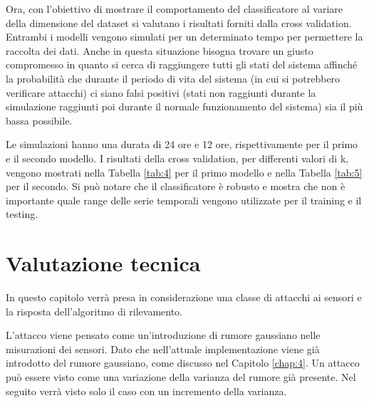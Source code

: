 \documentclass[Lau,binding=0.6cm,noexaminfo]{sapthesis}
\begin{document}
Ora, con l'obiettivo di mostrare il comportamento del classificatore al variare della dimensione del dataset si valutano i risultati  forniti dalla cross validation.
Entrambi i modelli vengono simulati per un determinato tempo per permettere la raccolta dei dati. Anche in questa situazione bisogna trovare un giusto compromesso in quanto 
si cerca di raggiungere tutti gli stati del sistema affinché la probabilit\`a che durante il periodo di vita del sistema (in cui si potrebbero verificare attacchi) ci siano falsi positivi (stati non raggiunti durante la simulazione raggiunti poi durante il normale funzionamento del sistema) sia il pi\`u bassa possibile.

Le simulazioni hanno una durata di 24 ore e 12 ore, rispettivamente per il primo e il secondo modello.
I risultati della cross validation, per differenti valori di k, vengono mostrati nella Tabella \ref{tab:4} per il primo modello e nella Tabella \ref{tab:5} per il secondo.
Si pu\`o notare che il classificatore \`e robusto e mostra che non \`e importante quale range delle serie temporali vengono utilizzate per il training e il testing.


\section{Valutazione tecnica}

In questo capitolo verr\`a presa in considerazione una classe di attacchi ai sensori e la risposta dell'algoritmo di rilevamento.

L'attacco viene pensato come un'introduzione di rumore gaussiano nelle misurazioni dei sensori. Dato che nell'attuale implementazione viene gi\`a introdotto del rumore gaussiano, come discusso nel Capitolo \ref{chap:4}. 
Un attacco pu\`o essere visto come una variazione della varianza del rumore gi\`a presente. 
Nel seguito verr\`a visto solo il caso con un incremento della varianza.
\end{document}
